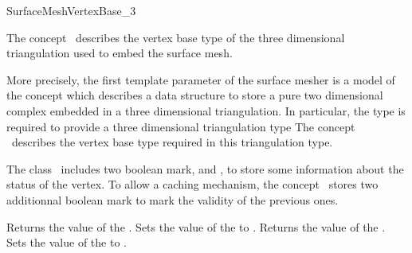 

\begin{ccRefConcept}{SurfaceMeshVertexBase_3}


\ccDefinition
  
The concept \ccRefName\ describes the vertex base type
of the three dimensional triangulation used
to embed the surface mesh.

More precisely,
the first template parameter  of the surface mesher
is a model of the concept 
which describes a data structure to store
a pure two dimensional complex 
embedded in a three dimensional triangulation.
In particular, the type  is required to provide
a three dimensional triangulation type
The concept \ccRefName\ describes the vertex base type
required in this triangulation type.





\ccGeneralizes




The class \ccRefName\ includes two boolean  mark,
  and , 
to store some information about the status of the vertex.
To allow a caching mechanism, 
the concept \ccRefName\ stores two additionnal boolean mark
to mark the validity of the previous ones.






\ccCreation
{}  %


\ccOperations

{Returns the value of the .}
\ccGlue
{}
{ Sets the value of the  to .}
\ccGlue
{}
{Returns the value of the .}
\ccGlue
{}
{Sets the value of the  to .}


\end{ccRefConcept}
